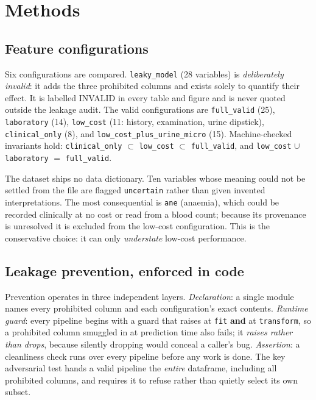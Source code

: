 \documentclass[conference]{IEEEtran}
\begin{document}
\section{Methods}

\subsection{Feature configurations}

Six configurations are compared. \texttt{leaky\_model} (28 variables) is
\emph{deliberately invalid}: it adds the three prohibited columns and exists
solely to quantify their effect. It is labelled INVALID in every table and
figure and is never quoted outside the leakage audit. The valid
configurations are \texttt{full\_valid} (25), \texttt{laboratory} (14),
\texttt{low\_cost} (11: history, examination, urine dipstick),
\texttt{clinical\_only} (8), and \texttt{low\_cost\_plus\_urine\_micro} (15).
Machine-checked invariants hold: \texttt{clinical\_only} $\subset$
\texttt{low\_cost} $\subset$ \texttt{full\_valid}, and
\texttt{low\_cost} $\cup$ \texttt{laboratory} $=$ \texttt{full\_valid}.

The dataset ships no data dictionary. Ten variables whose meaning could not be
settled from the file are flagged \texttt{uncertain} rather than given
invented interpretations. The most consequential is \texttt{ane} (anaemia),
which could be recorded clinically at no cost or read from a blood count;
because its provenance is unresolved it is excluded from the low-cost
configuration. This is the conservative choice: it can only \emph{understate}
low-cost performance.

\subsection{Leakage prevention, enforced in code}
\label{sec:leakageprev}

Prevention operates in three independent layers. \emph{Declaration}: a single
module names every prohibited column and each configuration's exact contents.
\emph{Runtime guard}: every pipeline begins with a guard that raises at
\texttt{fit} \textbf{and} at \texttt{transform}, so a prohibited column
smuggled in at prediction time also fails; it \emph{raises rather than drops},
because silently dropping would conceal a caller's bug. \emph{Assertion}: a
cleanliness check runs over every pipeline before any work is done. The key
adversarial test hands a valid pipeline the \emph{entire} dataframe, including
all prohibited columns, and requires it to refuse rather than quietly select
its own subset.
\end{document}
